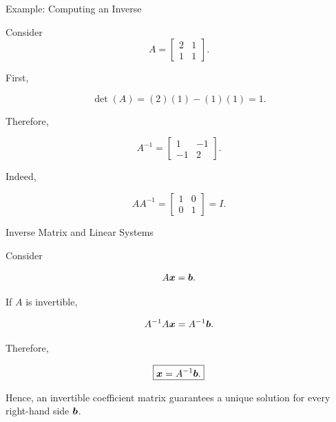 
\begin{frame}{Example: Computing an Inverse}

Consider
\vspace{-0.1cm}
\[
A=
\begin{bmatrix}
2&1\\
1&1
\end{bmatrix}.
\]

First,

\[
\det(A)
=
(2)(1)-(1)(1)
=
1.
\]

Therefore,

\[
A^{-1}
=
\begin{bmatrix}
1&-1\\
-1&2
\end{bmatrix}.
\]

Indeed,

\[
AA^{-1}
=
\begin{bmatrix}
1&0\\
0&1
\end{bmatrix}
=
I.
\]

\end{frame}



\begin{frame}{Inverse Matrix and Linear Systems}

Consider

\[
A\bm{x}=\bm{b}.
\]

If $A$ is invertible,

\[
A^{-1}A\bm{x}
=
A^{-1}\bm{b}.
\]

Therefore,

\[
\boxed{
\bm{x}=A^{-1}\bm{b}.
}
\]

\vspace{0.4cm}

Hence, an invertible coefficient matrix guarantees a
unique solution for every right-hand side $\bm{b}$.

\end{frame}



